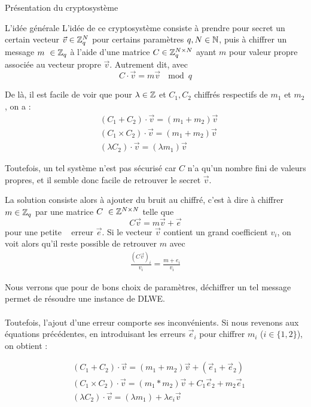 \begin{section}{Présentation du cryptosystème}
	\begin{subsection}{L'idée générale}
	L'idée de ce cryptosystème consiste à prendre pour secret un certain vecteur $\vec{v} \in \mathbb{Z}_q^N$ pour certains paramètres $q, N \in \mathbb{N}$, puis à chiffrer un message $m \in \ZZq$ à l'aide d'une matrice $C \in \mathbb{Z}_q^{N \times N}$ ayant $m$ pour valeur propre associée au vecteur propre $\vec{v}$. Autrement dit, avec
\[C \cdot \vec{v} = m \vec{v}\: \mod q \]

	De là, il est facile de voir que pour $\lambda \in \mathbb{Z}$ et  $C_1, C_2$ chiffrés respectifs de $m_1$ et $m_2$, on a :
	\begin{align*}
	& (C_1 + C_2) \cdot \vec{v} = (m_1 + m_2) \vec{v} \\
	& (C_1 \times C_2) \cdot \vec{v} = (m_1 + m_2) \vec{v} \\
	& (\lambda  C_2) \cdot \vec{v} = (\lambda m_1) \vec{v} 
	\end{align*}

	Toutefois, un tel système n'est pas sécurisé car $C$ n'a qu'un nombre fini de valeurs propres, et il semble donc facile de retrouver le secret $\vec{v}$.

	La solution consiste alors à ajouter du bruit au chiffré, c'est à dire à chiffrer $m\in \ZZq$ par une matrice $C \in \ZZ^{N \times N}$ telle que 
	\[ C \vec{v} = m \vec{v} + \vec{e} \]
	pour une \og petite \fg~ erreur $\vec{e}$. Si le vecteur $\vec{v}$ contient un grand coefficient $v_i$, on voit alors qu'il reste possible de retrouver $m$ avec
	\begin{align*}
	\frac{{(C \vec{v})}_i}{v_i} = \frac{m + e_i}{v_i}
	\end{align*}
	
	Nous verrons que pour de bons choix de paramètres, déchiffrer un tel message permet de résoudre une instance de
	DLWE.

\paragraph{}
	Toutefois, l'ajout d'une erreur comporte ses inconvénients. Si nous revenons aux équations précédentes, en introduisant les erreurs $\vec{e}_i$ pour chiffrer  $m_i$ ($i\in \{1,2\}$), on obtient :

	\begin{align*}
	& (C_1 + C_2) \cdot \vec{v} = (m_1 + m_2) \vec{v} + (\vec{e}_1 + \vec{e}_2)\\
	& (C_1 \times C_2) \cdot \vec{v} = (m_1 * m_2) \vec{v} + C_1 \vec{e}_2 + m_2\vec{e}_1 \\
	& (\lambda  C_2) \cdot \vec{v} = (\lambda m_1) + \lambda e_i\vec{v} 
	\end{align*}


\end{subsection}
\end{section}
